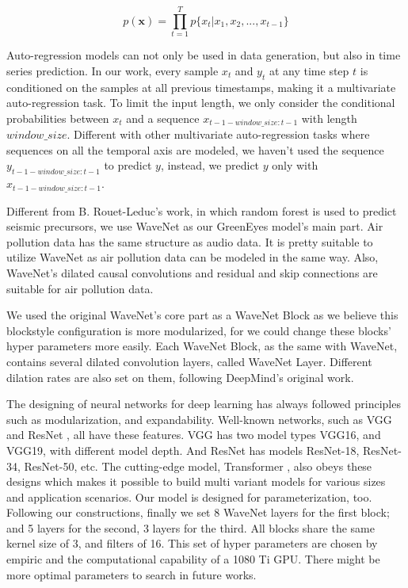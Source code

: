 \documentclass[
twocolumn,
]{ceurart}
\begin{document}
\begin{equation}
    p(\textbf{x})=\prod_{t=1}^Tp\{x_t|x_1,x_2,...,x_{t-1}\}
    \label{eq:auto-regression-model}
\end{equation}

Auto-regression models can not only be used in data generation, but also in time series prediction. In our work, every sample $x_t$ and $y_t$ at any time step $t$ is conditioned on the samples at all previous timestamps, making it a multivariate auto-regression task. To limit the input length,  we only consider the conditional probabilities between $x_t$ and a sequence $x_{t-1-window\_size:t-1}$ with length $window\_size$. Different with other multivariate auto-regression tasks where sequences on all the temporal axis are modeled, we haven't used the sequence $y_{t-1-window\_size:t-1}$ to predict $y$, instead, we predict $y$ only with $x_{t-1-window\_size:t-1}$.

Different from B. Rouet-Leduc's work\cite{rouet2017machine}, in which random forest is used to predict seismic precursors, we use WaveNet as our GreenEyes model's main part. Air pollution data has the same structure as audio data. It is pretty suitable to utilize WaveNet as air pollution data can be modeled in the same way. Also, WaveNet's dilated causal convolutions and residual and skip connections are suitable for air pollution data.

We used the original WaveNet's core part as a WaveNet Block as we believe this block\-style configuration is more modularized, for we could change these blocks' hyper parameters more easily. Each WaveNet Block, as the same with WaveNet, contains several dilated convolution layers, called WaveNet Layer. Different dilation rates are also set on them, following DeepMind's original work. 

The designing of neural networks for deep learning has always followed principles such as modularization, and expandability. Well-known networks, such as VGG \cite{simonyan2014very} and ResNet \cite{he2016deep}, all have these features. VGG has two model types VGG16, and VGG19, with different model depth. And ResNet has models ResNet-18, ResNet-34, ResNet-50, etc. The cutting-edge model, Transformer \cite{vaswani2017attention}, also obeys these designs which makes it possible to build multi variant models for various sizes and application scenarios. Our model is designed for parameterization, too. Following our constructions, finally we set 8 WaveNet layers for the first block; and 5 layers for the second, 3 layers for the third. All blocks share the same kernel size of 3, and filters of 16. This set of hyper parameters are chosen by empiric and the computational capability of a 1080 Ti GPU. There might be more optimal parameters to search in future works.
\end{document}
